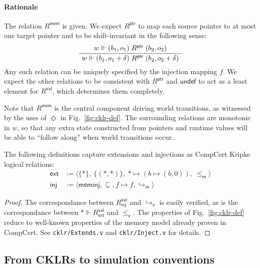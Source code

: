 \documentclass[acmsmall,authordraft]{acmart}
\newcommand{\kw}[1]{\ensuremath{ \mathsf{#1} }}
\newcommand{\vref}{\le_\kw{v}}
\newcommand{\mext}{\le_\kw{m}}
\begin{document}
\paragraph{Rationale}

The relation $R^\kw{mem}$ is given.
We expect $R^\kw{ptr}$ to map
each source pointer to at most one target pointer
and to be shift-invariant in the following sense:
\[
  \AxiomC{$w \Vdash (b_1, o_1) \mathrel{R^\kw{ptr}} (b_2, o_2)$}
  \UnaryInfC{$w \Vdash (b_1, o_1 + \delta) \mathrel{R^\kw{ptr}} (b_2, o_2 + \delta)$}
  \DisplayProof
\]
Any such relation can be uniquely specified by
the injection mapping $f$.
We expect the other relations to be consistent with $R^\kw{ptr}$
and $\kw{undef}$ to act as a least element for $R^\kw{val}$,
which determines them completely.

Note that $R^\kw{mem}$
is the central component driving world transitions,
as witnessed by the uses of $\Diamond$ in Fig.~\ref{fig:cklr-def}.
The surrounding relations are monotonic in $w$,
so that any extra state
constructed from pointers and runtime values
will be able to ``follow along'' when
world transitions occur.

\begin{theorem}
The following definitions capture extensions and
injections as CompCert Kripke logical relations:
\begin{align*}
  \kw{ext} &:=
    \langle \{*\}, \: \{(*,*)\}, \: * \mapsto (b \mapsto (b, 0)), \:
    {\mext} \rangle
  \\
  \kw{inj} &:=
    \langle \kw{meminj}, {\subseteq}, f \mapsto f,
      {\hookrightarrow_\kw{m}} \rangle
\end{align*}
\begin{proof}
The correspondance between $R^\kw{val}_\kw{inj}$ and
$\hookrightarrow_\kw{v}$ is easily verified,
as is the correspondance between
$* \Vdash R^\kw{val}_\kw{ext}$ and $\vref$.
The properties of Fig.~\ref{fig:cklr-def}
reduce to well-known properties of the memory model
already proven in CompCert.
See \texttt{cklr/Extends.v} and \texttt{cklr/Inject.v}
for details.
\end{proof}
\end{theorem}


\subsection{From CKLRs to simulation conventions} \label{sec:param} %
\end{document}
